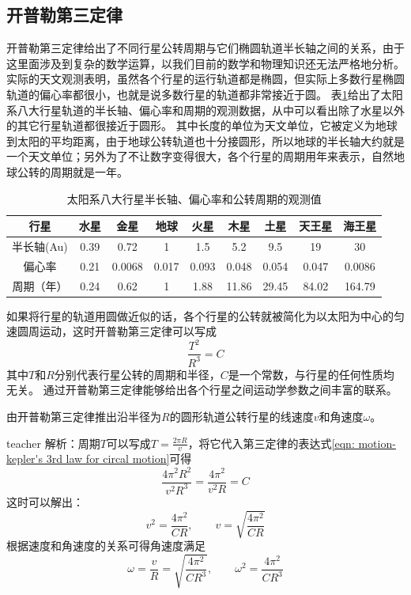 \subsection{开普勒第三定律}

开普勒第三定律给出了不同行星公转周期与它们椭圆轨道半长轴之间的关系，由于这里面涉及到复杂的数学运算，以我们目前的数学和物理知识还无法严格地分析。
实际的天文观测表明，虽然各个行星的运行轨道都是椭圆，但实际上多数行星椭圆轨道的偏心率都很小，也就是说多数行星的轨道都非常接近于圆。
表\ref{table: motion-太阳系行星数据}给出了太阳系八大行星轨道的半长轴、偏心率和周期的观测数据，从中可以看出除了水星以外的其它行星轨道都很接近于圆形。
其中长度的单位为{\heiti 天文单位}，它被定义为地球到太阳的平均距离，由于地球公转轨道也十分接圆形，所以地球的半长轴大约就是一个天文单位；另外为了不让数字变得很大，各个行星的周期用年来表示，自然地球公转的周期就是一年。


\begin{table}[ht]
\begin{center}
\begin{tabular}{|c|c|c|c|c|c|c|c|c|}
\hline 
行星 & 水星 & 金星 & 地球 & 火星 & 木星 & 土星 & 天王星 & 海王星 \\ 
\hline 
半长轴(Au) & 0.39 & 0.72 & 1 & 1.5 & 5.2 & 9.5 & 19 & 30 \\ 
\hline 
偏心率 & 0.21 & 0.0068 & 0.017 & 0.093 & 0.048 & 0.054 & 0.047 & 0.0086 \\ 
\hline 
周期（年） & 0.24 & 0.62 & 1 & 1.88 & 11.86 & 29.45 & 84.02 & 164.79 \\ 
\hline 
\end{tabular} 
\caption{太阳系八大行星半长轴、偏心率和公转周期的观测值}\label{table: motion-太阳系行星数据}
\end{center}
\end{table}


如果将行星的轨道用圆做近似的话，各个行星的公转就被简化为以太阳为中心的匀速圆周运动，这时开普勒第三定律可以写成
\begin{equation}\label{eqn: motion-kepler's 3rd law for circal motion}
\frac{T^2}{R^3}=C
\end{equation}
其中$T$和$R$分别代表行星公转的周期和半径，$C$是一个常数，与行星的任何性质均无关。
通过开普勒第三定律能够给出各个行星之间运动学参数之间丰富的联系。

\begin{example}
由开普勒第三定律推出沿半径为$R$的圆形轨道公转行星的线速度$v$和角速度$\omega$。
\begin{taggedblock}{teacher}
\newline
解析：周期$T$可以写成$T = \frac{2\pi R}{v}$，将它代入第三定律的表达式\ref{eqn: motion-kepler's 3rd law for circal motion}可得
\[
\frac{4\pi^2 R^2}{v^2 R^3} = \frac{4\pi^2}{v^2R} = C
\]
这时可以解出：
\[
v^2 = \frac{4\pi^2}{CR},\qquad v = \sqrt{ \frac{4\pi^2}{CR}}
\]
根据速度和角速度的关系可得角速度满足
\[
\omega = \frac{v}{R} = \sqrt{ \frac{4\pi^2}{CR^3}},\qquad \omega^2 = \frac{4\pi^2}{CR^3}
\]
\end{taggedblock}
\end{example}


